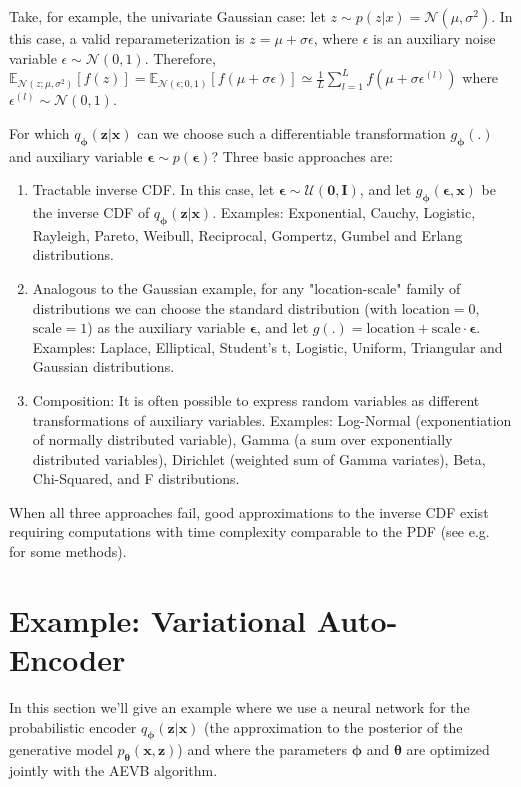 \documentclass{article} %
\theoremstyle{definition}
\newcommand{\bb}[1]{\mathbf{#1}}
\newcommand{\bx}{\bb{x}}
\newcommand{\bz}{\bb{z}}
\newcommand{\bT}{\boldsymbol{\theta}}
\newcommand{\bphi}{\boldsymbol{\phi}}
\newcommand{\beps}{\boldsymbol{\epsilon}}
\newcommand{\bzero}{\bb{0}}
\newcommand{\bI}{\bb{I}}
\newcommand{\pT}{p_{\bT}}
\newcommand{\qPhi}{q_{\bphi}}
\newcommand{\gPhi}{g_{\bphi}}
\newcommand{\Exp}[2]{\mathbb{E}_{#1}\left[#2\right]}
\theoremstyle{definition}
\begin{document}
Take, for example, the univariate Gaussian case: let $z \sim p(z|x) = \mathcal{N}(\mu, \sigma^2)$. In this case, a valid reparameterization is $z = \mu + \sigma \epsilon$, where $\epsilon$ is an auxiliary noise variable $\epsilon \sim \mathcal{N}(0,1)$. Therefore, $\Exp{\mathcal{N}(z; \mu, \sigma^2)}{f(z)} = \Exp{\mathcal{N}(\epsilon; 0, 1)}{f(\mu + \sigma \epsilon)} \simeq \frac{1}{L} \sum_{l=1}^L f(\mu + \sigma \epsilon^{(l)})$ where $\epsilon^{(l)} \sim \mathcal{N}(0,1)$.

For which $\qPhi(\bz|\bx)$ can we choose such a differentiable transformation $\gPhi(.)$ and auxiliary variable $\beps \sim p(\beps)$? Three basic approaches are:
\begin{enumerate}
\item Tractable inverse CDF. In this case, let $\beps \sim \mathcal{U}(\bzero,\bI)$, and let $\gPhi(\beps,\bx)$ be the inverse CDF of $\qPhi(\bz|\bx)$. Examples: Exponential, Cauchy, Logistic, Rayleigh, Pareto, Weibull, Reciprocal, Gompertz, Gumbel and Erlang distributions.

\item Analogous to the Gaussian example, for any "location-scale" family of distributions we can choose the standard distribution (with $\text{location} =0$, $\text{scale} =1$) as the auxiliary variable $\beps$, and let $g(.)=\text{location}+\text{scale} \cdot \beps$. Examples: Laplace, Elliptical, Student's t, Logistic, Uniform, Triangular and Gaussian distributions.

\item Composition: It is often possible to express random variables as different transformations of auxiliary variables. Examples: Log-Normal (exponentiation of normally distributed variable), Gamma (a sum over exponentially distributed variables), Dirichlet (weighted sum of Gamma variates), Beta, Chi-Squared, and F distributions.
\end{enumerate}

When all three approaches fail, good approximations to the inverse CDF exist requiring computations with time complexity comparable to the PDF (see e.g. ~\cite{devroye1986sample} for some methods).

\section{Example: Variational Auto-Encoder}
\label{sec:example}
In this section we'll give an example where we use a neural network for the probabilistic encoder $\qPhi(\bz|\bx)$ (the approximation to the posterior of the generative model $\pT(\bx, \bz)$) and where the parameters $\bphi$ and $\bT$ are optimized jointly with the AEVB algorithm.
%
\end{document}

